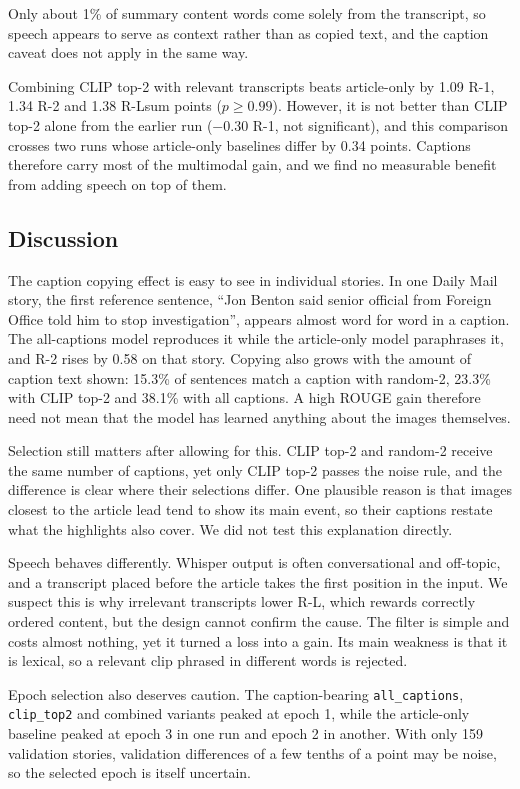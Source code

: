 \documentclass[conference]{IEEEtran}
\begin{document}
Only about 1\% of summary content words come solely from the transcript, so speech appears to serve as context rather than as copied text, and the caption caveat does not apply in the same way.

Combining CLIP top-2 with relevant transcripts beats article-only by 1.09 R-1, 1.34 R-2 and 1.38 R-Lsum points ($p\ge0.99$). However, it is not better than CLIP top-2 alone from the earlier run ($-0.30$ R-1, not significant), and this comparison crosses two runs whose article-only baselines differ by 0.34 points. Captions therefore carry most of the multimodal gain, and we find no measurable benefit from adding speech on top of them.

\subsection{Discussion}
The caption copying effect is easy to see in individual stories. In one Daily Mail story, the first reference sentence, ``Jon Benton said senior official from Foreign Office told him to stop investigation'', appears almost word for word in a caption. The all-captions model reproduces it while the article-only model paraphrases it, and R-2 rises by 0.58 on that story. Copying also grows with the amount of caption text shown: 15.3\% of sentences match a caption with random-2, 23.3\% with CLIP top-2 and 38.1\% with all captions. A high ROUGE gain therefore need not mean that the model has learned anything about the images themselves.

Selection still matters after allowing for this. CLIP top-2 and random-2 receive the same number of captions, yet only CLIP top-2 passes the noise rule, and the difference is clear where their selections differ. One plausible reason is that images closest to the article lead tend to show its main event, so their captions restate what the highlights also cover. We did not test this explanation directly.

Speech behaves differently. Whisper output is often conversational and off-topic, and a transcript placed before the article takes the first position in the input. We suspect this is why irrelevant transcripts lower R-L, which rewards correctly ordered content, but the design cannot confirm the cause. The filter is simple and costs almost nothing, yet it turned a loss into a gain. Its main weakness is that it is lexical, so a relevant clip phrased in different words is rejected.

Epoch selection also deserves caution. The caption-bearing \texttt{all\_captions}, \texttt{clip\_top2} and combined variants peaked at epoch 1, while the article-only baseline peaked at epoch 3 in one run and epoch 2 in another. With only 159 validation stories, validation differences of a few tenths of a point may be noise, so the selected epoch is itself uncertain.
\end{document}
